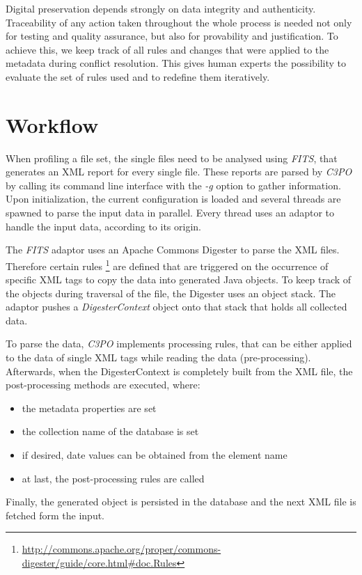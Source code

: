 \documentclass[a4paper,12pt]{article}
\begin{document}
Digital preservation depends strongly on data integrity and authenticity. Traceability of any action taken throughout the whole process is needed not only for testing and quality assurance, but also for provability and justification. To achieve this, we keep track of all rules and changes that were applied to the metadata during conflict resolution. This gives human experts the possibility to evaluate the set of rules used and to redefine them iteratively.


\section{Workflow}
When profiling a file set, the single files need to be analysed using \emph{FITS}, that generates an XML report for every single file. These reports are parsed by \emph{C3PO} by calling its command line interface with the \emph{-g} option to gather information. Upon initialization, the current configuration is loaded and several threads are spawned to parse the input data in parallel. Every thread uses an adaptor to handle the input data, according to its origin.

The \emph{FITS} adaptor uses an Apache Commons Digester to parse the XML files. Therefore certain rules \footnote{\url{http://commons.apache.org/proper/commons-digester/guide/core.html\#doc.Rules}} are defined that are triggered on the occurrence of specific XML tags to copy the data into generated Java objects. To keep track of the objects during traversal of the file, the Digester uses an object stack. The adaptor pushes a \emph{DigesterContext} object onto that stack that holds all collected data.

To parse the data, \emph{C3PO} implements processing rules, that can be either applied to the data of single XML tags while reading the data (pre-processing). Afterwards, when the DigesterContext is completely built from the XML file, the post-processing methods are executed, where:
\begin{itemize}
\item the metadata properties are set
\item the collection name of the database is set
\item if desired, date values can be obtained from the element name
\item at last, the post-processing rules are called
\end{itemize}
Finally, the generated object is persisted in the database and the next XML file is fetched form the input.
\end{document}
